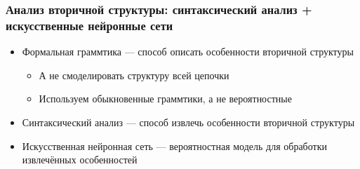 \documentclass[xcolor=table]{beamer}
\begin{document}
\begin{frame} \frametitle{Анализ вторичной структуры: синтаксический анализ + искусственные нейронные сети}

\begin{itemize}
  \item Формальная граммтика --- способ описать особенности вторичной структуры 
  \begin{itemize}
     \item А не смоделировать структуру всей цепочки
     \item Используем обыкновенные граммтики, а не вероятностные
  \end{itemize}
  \item Синтаксический анализ --- способ извлечь особенности вторичной структуры
  \item Искусственная нейронная сеть --- вероятностная модель для обработки извлечённых особенностей
\end{itemize}

\end{frame}
\end{document}
